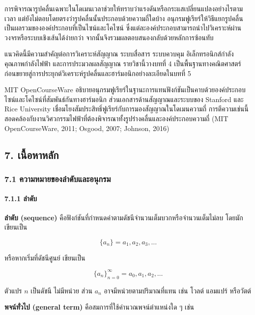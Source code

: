 การพิจารณารูปคลื่นเฉพาะในโดเมนเวลาช่วยให้ทราบว่าแรงดันหรือกระแสเปลี่ยนแปลงอย่างไรตามเวลา แต่ยังไม่ตอบโดยตรงว่ารูปคลื่นนั้นประกอบด้วยความถี่ใดบ้าง อนุกรมฟูเรียร์ให้วิธีแยกรูปคลื่นเป็นผลรวมขององค์ประกอบที่เป็นไซน์และโคไซน์ ซึ่งแต่ละองค์ประกอบสามารถนำไปวิเคราะห์ผ่านวงจรหรือระบบเชิงเส้นได้ง่ายกว่า จากนั้นจึงรวมผลตอบสนองกลับด้วยหลักการซ้อนทับ

แนวคิดนี้มีความสำคัญต่อการวิเคราะห์สัญญาณ ระบบสื่อสาร ระบบควบคุม อิเล็กทรอนิกส์กำลัง คุณภาพกำลังไฟฟ้า และการประมวลผลสัญญาณ รายวิชานี้วางบทที่ 4 เป็นพื้นฐานทางคณิตศาสตร์ ก่อนขยายสู่การประยุกต์วิเคราะห์รูปคลื่นและฮาร์มอนิกอย่างละเอียดในบทที่ 5

MIT OpenCourseWare อธิบายอนุกรมฟูเรียร์ในฐานะการแทนฟังก์ชันเป็นคาบด้วยองค์ประกอบไซน์และโคไซน์ที่สัมพันธ์กันทางฮาร์มอนิก ส่วนเอกสารด้านสัญญาณและระบบของ Stanford และ Rice University เชื่อมโยงสัมประสิทธิ์ฟูเรียร์กับการมองสัญญาณในโดเมนความถี่ การตีความเช่นนี้สอดคล้องกับงานวิศวกรรมไฟฟ้าที่ต้องพิจารณาทั้งรูปร่างคลื่นและองค์ประกอบความถี่ (MIT OpenCourseWare, 2011; Osgood, 2007; Johnson, 2016)


\subsection{7. เนื้อหาหลัก}

\subsubsection{7.1 ความหมายของลำดับและอนุกรม}

\paragraph{7.1.1 ลำดับ}

\textbf{ลำดับ (sequence)} คือฟังก์ชันที่กำหนดค่าตามดัชนีจำนวนเต็มบวกหรือจำนวนเต็มไม่ลบ โดยมักเขียนเป็น

\[
\{a_n\}=a_1,a_2,a_3,\ldots
\]

หรือหากเริ่มที่ดัชนีศูนย์ เขียนเป็น

\[
\{a_n\}_{n=0}^{\infty}=a_0,a_1,a_2,\ldots
\]

ตัวแปร \(n\) เป็นดัชนี ไม่มีหน่วย ส่วน \(a_n\) อาจมีหน่วยตามปริมาณที่แทน เช่น โวลต์ แอมแปร์ หรือวัตต์

\textbf{พจน์ทั่วไป (general term)} คือสมการที่ใช้คำนวณพจน์ตำแหน่งใด ๆ เช่น

